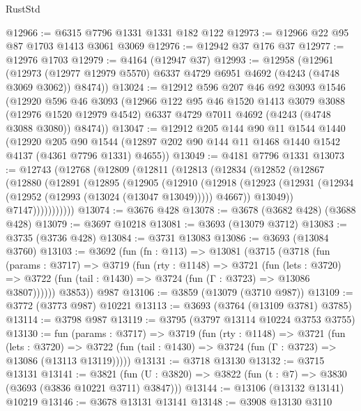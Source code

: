 \begin{lexlean}{RustStd}
\begin{coremodule}
@12966 := @6315 @7796 @1331 @1331 @182 @122
@12973 := @12966 @22 @95 @87 @1703 @1413 @3061 @3069
@12976 := @12942 @37 @176 @37
@12977 := @12976 @1703
@12979 := @4164 (@12947 @37)
@12993 := @12958
    (@12961
      (@12973 (@12977 @12979 @5570) @6337 @4729 @6951 @4692 (@4243 (@4748 @3069 @3062)) @8474))
@13024 := @12912
    @596
    @207
    @46
    @92
    @3093
    @1546
    (@12920
      @596
      @46
      @3093
      (@12966
        @122
        @95
        @46
        @1520
        @1413
        @3079
        @3088
        (@12976 @1520 @12979 @4542)
        @6337
        @4729
        @7011
        @4692
        (@4243 (@4748 @3088 @3080))
        @8474))
@13047 := @12912
    @205
    @144
    @90
    @11
    @1544
    @1440
    (@12920
      @205
      @90
      @1544
      (@12897 @202 @90 @144 @11 @1468 @1440 @1542 @4137 (@4361 @7796 @1331) @4655))
@13049 := @4181 @7796 @1331
@13073 := @12743
    (@12768
      (@12809
        (@12811
          (@12813
            (@12834
              (@12852
                (@12867
                  (@12880
                    (@12891
                      (@12895
                        (@12905
                          (@12910
                            (@12918
                              (@12923
                                (@12931 (@12934 (@12952 (@12993 (@13024 (@13047 @13049))))) @4667))
                              @13049))
                          @7147)))))))))))
@13074 := @3676 @428
@13078 := @3678 (@3682 @428) (@3688 @428)
@13079 := @3697 @10218
@13081 := @3693 (@13079 @3712)
@13083 := @3735 (@3736 @428)
@13084 := @3731 @13083
@13086 := @3693 (@13084 @3760)
@13103 := @3692
    (fun (fn : @113) =>
    @13081
      (@3715
        (@3718
          (fun (params : @3717) =>
          @3719
            (fun (rty : @1148) =>
            @3721
              (fun (lets : @3720) =>
              @3722 (fun (tail : @1430) => @3724 (fun (Γ : @3723) => @13086 @3807))))))
        @3853))
    @987
@13106 := @3859 (@13079 (@3710 @987))
@13109 := @3772 (@3773 @987) @10221
@13113 := @3693 (@3764 (@13109 @3781) @3785)
@13114 := @3798 @987
@13119 := @3795 (@3797 @13114 @10224 @3753 @3755)
@13130 := fun (params : @3717) =>
  @3719
    (fun (rty : @1148) =>
    @3721
      (fun (lets : @3720) =>
      @3722 (fun (tail : @1430) => @3724 (fun (Γ : @3723) => @13086 (@13113 @13119)))))
@13131 := @3718 @13130
@13132 := @3715 @13131
@13141 := @3821
    (fun (U : @3820) => @3822 (fun (t : @7) => @3830 (@3693 (@3836 @10221 @3711) @3847)))
@13144 := @13106 (@13132 @13141) @10219
@13146 := @3678 @13131 @13141
@13148 := @3908 @13130 @3110

\end{coremodule}
\end{lexlean}
